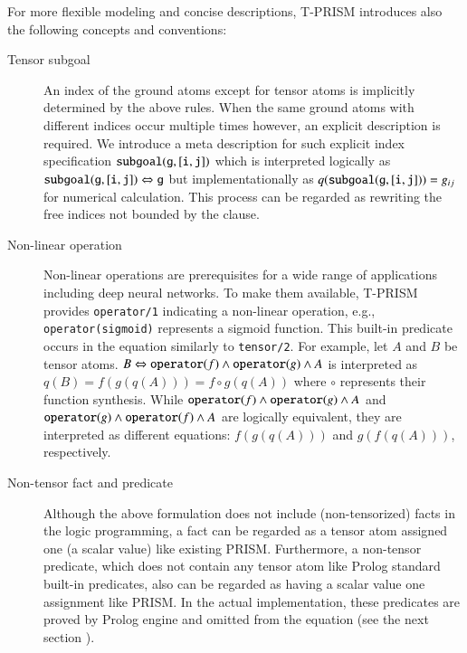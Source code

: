 \documentclass[a4paper]{report}
\begin{document}
For more flexible modeling  and concise descriptions, T-PRISM introduces
also the following concepts and conventions:

\begin{description}
	\item [Tensor subgoal]
	An index  of the ground  atoms except  for tensor atoms  is implicitly
	determined  by  the above  rules.  When  the  same ground  atoms  with
	different   indices  occur   multiple  times   however,  an   explicit
	description is  required.  We  introduce a  meta description  for such
	explicit  index   specification  ${\tt  subgoal(g,[i,j])}$   which  is
	interpreted  logically as  ${\tt subgoal(g,  [i, j])}  \Leftrightarrow
	{\tt g}$ but  implementationally as $q({\tt subgoal(g,[i,j])})=g_{ij}$
	for numerical calculation.  This process can be  regarded as rewriting
	the free indices not bounded by the clause.
	
	\item [Non-linear operation]
	Non-linear  operations   are  prerequisites   for  a  wide   range  of
	applications including  deep neural networks. To  make them available,
	T-PRISM provides  {\tt operator/1} indicating a  non-linear operation,
	e.g.,  {\tt operator(sigmoid)}  represents  a  sigmoid function.  This
	built-in predicate occurs in the equation similarly to {\tt tensor/2}.
	For example, let $A$ and $B$  be tensor atoms. $B \Leftrightarrow {\tt
		operator}(f)  \wedge {\tt  operator}(g)  \wedge A$  is interpreted  as
	$q(B) = f(g(q(A))) = f \circ  g (q(A))$ where $\circ$ represents their
	function    synthesis.    While    ${\tt    operator}(f)\wedge    {\tt
		operator}(g)   \wedge    A$   and   ${\tt    operator}(g)\wedge   {\tt
		operator}(f) \wedge A$ are  logically equivalent, they are interpreted
	as different equations: $f(g(q(A)))$ and $g(f(q(A)))$, respectively.
	
	\item [Non-tensor fact and predicate] 
	Although the above formulation does not include (non-tensorized) facts
	in the  logic programming,  a fact  can be regarded  as a  tensor atom
	assigned one (a scalar value) like existing PRISM.  Furthermore, a
	non-tensor  predicate, which  does not  contain any  tensor atom  like
	Prolog standard built-in predicates, also  can be regarded as having a
	scalar value one assignment like  PRISM. In the actual implementation,
	these  predicates are  proved by  Prolog engine  and omitted  from the
	equation (see the next section ).
\end{description}
\end{document}
